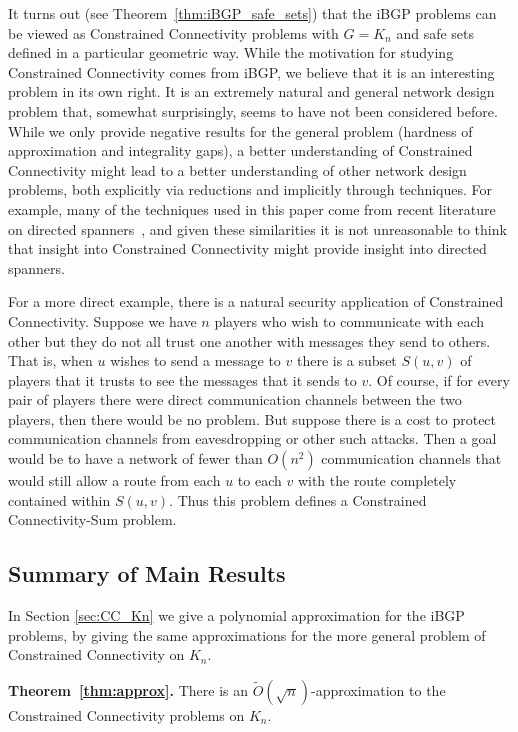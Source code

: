 \documentclass[11pt,letterpaper]{article}
\theoremstyle{definition}
\begin{document}
It turns out (see Theorem~\ref{thm:iBGP_safe_sets}) that the iBGP problems can be viewed as Constrained Connectivity problems with $G = K_n$ and safe sets defined in a particular geometric way.  While the motivation for studying Constrained Connectivity comes from iBGP, we believe that it is an interesting problem in its own right.  It is an extremely natural and general network design problem that, somewhat surprisingly, seems to have not been considered before.  While we only provide negative results for the general problem (hardness of approximation and integrality gaps), a better understanding of Constrained Connectivity might lead to a better understanding of other network design problems, both explicitly via reductions and implicitly through techniques.  For example, many of the techniques used in this paper come from recent literature on directed spanners~\cite{BGJRW09,DK11,BBMRY11}, and given these similarities it is not unreasonable to think that insight into Constrained Connectivity might provide insight into directed spanners.

For a more direct example, there is a natural security application of Constrained Connectivity.  Suppose we have $n$ players who wish to communicate with each other
but they do not all trust one another with messages they send to others.
That is, when $u$ wishes to send a message to $v$ there is a subset
$S(u,v)$ of players that it trusts to see the messages that it sends to $v$.
Of course, if for every pair of players there were direct communication
channels between the two players, then there would be no problem.
But suppose there is a cost to protect communication channels from
eavesdropping or other such attacks.
Then a goal would be to have a network of fewer than $O(n^2)$
communication channels that would still allow a route from
each $u$ to each $v$ with the route completely contained within $S(u,v)$.
Thus this problem defines a {\sc Constrained Connectivity-Sum} problem.




\subsection{Summary of Main Results}

In Section \ref{sec:CC_Kn} we
give a polynomial approximation for the iBGP problems, by giving the same approximations for the more general problem of Constrained Connectivity on $K_n$.

\vspace{.1in}
{\bf Theorem~\ref{thm:approx}.}\hspace{.01in}
  There is an $\tilde{O}(\sqrt{n})$-approximation to the Constrained
  Connectivity problems on $K_n$.
\vspace{.1in}
\end{document}

